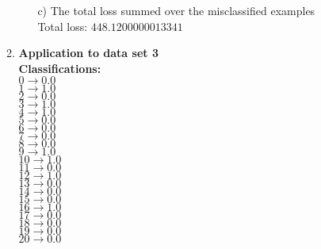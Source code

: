 \begin{enumerate}
\begin{enumerate}
\begin{enumerate}
					\item[c)] The total loss summed over the misclassified examples \\
					\textnormal{Total loss:} \( 448.1200000013341\)
				\end{enumerate}
			\item{\bf Application to data set 3} \\
				\bf{Classifications: } \\
				\( 0 \rightarrow 0.0 \) \\
				\( 1 \rightarrow 1.0 \) \\
				\( 2 \rightarrow 0.0 \) \\
				\( 3 \rightarrow 1.0 \) \\
				\( 4 \rightarrow 1.0 \) \\
				\( 5 \rightarrow 0.0 \) \\
				\( 6 \rightarrow 0.0 \) \\
				\( 7 \rightarrow 0.0 \) \\
				\( 8 \rightarrow 0.0 \) \\
				\( 9 \rightarrow 1.0 \) \\
				\( 10 \rightarrow 1.0 \) \\
				\( 11 \rightarrow 0.0 \) \\
				\( 12 \rightarrow 1.0 \) \\
				\( 13 \rightarrow 0.0 \) \\
				\( 14 \rightarrow 0.0 \) \\
				\( 15 \rightarrow 0.0 \) \\
				\( 16 \rightarrow 1.0 \) \\
				\( 17 \rightarrow 0.0 \) \\
				\( 18 \rightarrow 0.0 \) \\
				\( 19 \rightarrow 0.0 \) \\
				\( 20 \rightarrow 0.0 \) \\ \\
				

\end{enumerate}
\end{enumerate}

